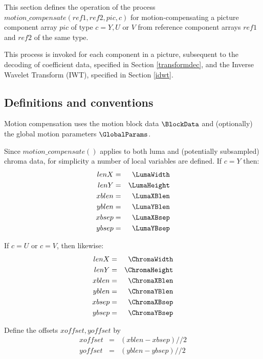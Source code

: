 \label{motioncompensate}

This section defines the operation of the process
$motion\_compensate(ref1, ref2,  pic, c)$ for motion-compensating a
picture component array  $pic$ of type $c=Y, U$ or $V$ from reference 
component arrays $ref1$ and $ref2$ of the same type.

This process is invoked for each component in a picture, subsequent to the 
decoding of coefficient data, specified in Section \ref{transformdec}, and the Inverse Wavelet 
Transform (IWT), specified in Section \ref{idwt}. 

\subsection{Definitions and conventions}

Motion compensation uses the motion block data $\BlockData$ and (optionally) the
global motion parameters $\GlobalParams$.

Since $motion\_compensate()$ applies to both luma and (potentially subsampled)
chroma data, for simplicity a number of local variables are defined. If $c=Y$ then:
\begin{eqnarray*}
lenX & = & \LumaWidth \\
lenY & = & \LumaHeight \\
xblen & = & \LumaXBlen \\
yblen & = & \LumaYBlen \\
xbsep & = & \LumaXBsep \\
ybsep & = & \LumaYBsep
\end{eqnarray*}

If $c=U$ or $c=V$, then likewise:
\begin{eqnarray*}
lenX & = & \ChromaWidth \\
lenY & = & \ChromaHeight \\
xblen & = & \ChromaXBlen \\
yblen & = & \ChromaYBlen \\
xbsep & = & \ChromaXBsep \\
ybsep & = & \ChromaYBsep
\end{eqnarray*}

Define the offsets $xoffset, yoffset$ by
\begin{eqnarray*}
xoffset & = & (xblen-xbsep)//2 \\
yoffset & = & (yblen-ybsep)//2
\end{eqnarray*}

